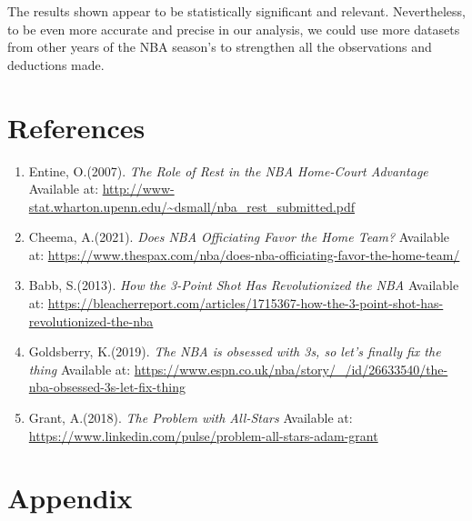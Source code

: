 \documentclass[
  12pt,
]{article}
\begin{document}
The results shown appear to be statistically significant and relevant. Nevertheless, to be even more accurate and precise in our analysis, we could use more datasets from other years of the NBA season's to strengthen all the observations and deductions made.

\hypertarget{references}{%
\section{References}\label{references}}

\begin{enumerate}
\def\labelenumi{\arabic{enumi}.}
\item
  Entine, O.(2007). \emph{The Role of Rest in the NBA Home-Court Advantage}
  Available at: \url{http://www-stat.wharton.upenn.edu/~dsmall/nba_rest_submitted.pdf}
\item
  Cheema, A.(2021). \emph{Does NBA Officiating Favor the Home Team?}
  Available at: \url{https://www.thespax.com/nba/does-nba-officiating-favor-the-home-team/}
\item
  Babb, S.(2013). \emph{How the 3-Point Shot Has Revolutionized the NBA}
  Available at: \url{https://bleacherreport.com/articles/1715367-how-the-3-point-shot-has-revolutionized-the-nba}
\item
  Goldsberry, K.(2019). \emph{The NBA is obsessed with 3s, so let's finally fix the thing}
  Available at: \url{https://www.espn.co.uk/nba/story/_/id/26633540/the-nba-obsessed-3s-let-fix-thing}
\item
  Grant, A.(2018). \emph{The Problem with All-Stars}
  Available at: \url{https://www.linkedin.com/pulse/problem-all-stars-adam-grant}
\end{enumerate}

\hypertarget{appendix}{%
\section{Appendix}\label{appendix}}
\end{document}
